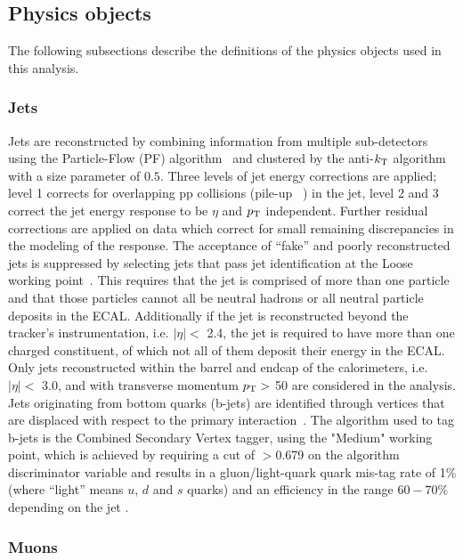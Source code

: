\clearpage
\subsection{Physics objects\label{sec:reconstruction}}

The following subsections describe the definitions of the physics objects 
used in this analysis.

\subsubsection{Jets\label{recJet}}

Jets are reconstructed by combining information from multiple
sub-detectors using the Particle-Flow (PF) algorithm~\cite{PAS-PFT-09-001} 
and clustered by the anti-$k_{\rm T}$ algorithm~\cite{antikt} with
a size parameter of $0.5$. Three levels of jet energy corrections are 
applied; level 1 corrects for overlapping pp collisions 
(pile-up ~\cite{Cacciari2008119,1126-6708-2008-04-005}) in the jet, 
level 2 and 3 correct the jet energy response to be $\eta$ and $p_{\mathrm{T}}$ independent.  
Further residual corrections are applied on data which correct for 
small remaining discrepancies in the modeling of the response. The acceptance of
``fake''  and poorly reconstructed jets is suppressed by selecting jets that pass 
jet identification at the Loose working point~\cite{ref:jet-id}. This requires 
that the jet is comprised of more than one particle and that those particles 
cannot all be neutral hadrons or all neutral particle deposits in the ECAL. 
Additionally if the jet is reconstructed beyond the tracker's instrumentation, 
i.e. $|\eta| <$ 2.4,  the jet is required to have more than one charged constituent, 
of which not all of them deposit their energy in the ECAL. 
Only jets reconstructed within the barrel and endcap of the calorimeters,
i.e. $|\eta| <$ 3.0, and with transverse momentum $p_{\mathrm{T}} >$ 50\gev  
are considered in the analysis. Jets originating from bottom quarks 
(b-jets) are identified through vertices that are displaced with respect to the primary 
interaction~\cite{CMS-PAS-BTV-12-001}. The algorithm used to tag b-jets 
is the Combined Secondary Vertex tagger, using the "Medium" working point, 
which is achieved by requiring a cut of $>$0.679 on the algorithm discriminator 
variable and results in a gluon/light-quark quark mis-tag rate of 1\% 
(where ``light'' means $u$, $d$ and $s$ quarks) and an efficiency in the 
range $60-70\%$ depending on the jet \pt. 

\subsubsection{Muons\label{sec:recMuon}}

